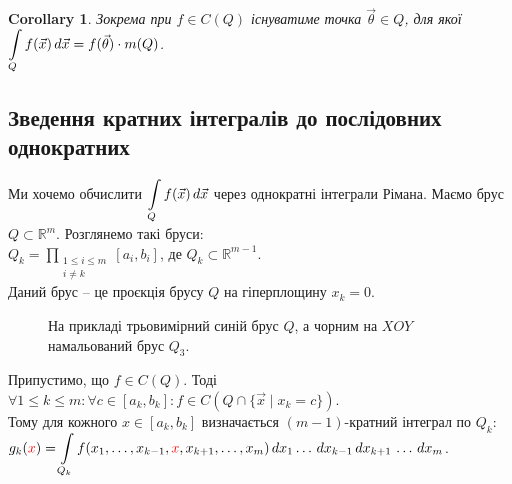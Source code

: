 \documentclass[a4paper, 10pt]{article}
\theoremstyle{theoremdd}
\theoremstyle{theoremdd}
\theoremstyle{theoremdd}
\theoremstyle{theoremdd}
\theoremstyle{theoremdd}
\theoremstyle{theoremdd}
\theoremstyle{theoremdd}
\theoremstyle{theoremdd}
\theoremstyle{theoremdd}
\theoremstyle{theoremdd}
\theoremstyle{theoremdd}
\theoremstyle{theoremdd}
\theoremstyle{theoremdd}
\theoremstyle{theoremdd}
\newtheorem{corollary}[theorem]{Corollary}
\theoremstyle{theoremdd}
\begin{document}
\begin{corollary}
Зокрема при $f \in C(Q)$ існуватиме точка $\vec{\theta} \in Q$, для якої $\displaystyle\int\displaylimits_Q f(\vec{x})\,d\vec{x} = f(\vec{\theta}) \cdot m (Q)$.
\end{corollary}

\subsection{Зведення кратних інтегралів до послідовних однократних}
Ми хочемо обчислити $\displaystyle\int\displaylimits_Q f(\vec{x})\,d\vec{x}$ через однократні інтеграли Рімана. Маємо брус $Q \subset \mathbb{R}^m$. Розглянемо такі бруси:\\
$Q_k = \displaystyle\prod_{\substack{1 \leq i \leq m \\ i \neq k}} [a_i,b_i]$, де $Q_k \subset \mathbb{R}^{m-1}$. \\
Даний брус -- це проєкція брусу $Q$ на гіперплощину $x_k = 0$.\\
\begin{figure}[H]
\centering
{}
\caption*{На прикладі трьовимірний синій брус $Q$, а чорним на $XOY$ намальований брус $Q_3$.}
\end{figure}
Припустимо, що $f \in C(Q)$. Тоді $\forall 1 \leq k \leq m: \forall c \in [a_k,b_k]: f \in C(Q \cap \{ \vec{x} \mid x_k = c \})$.\\
Тому для кожного $x \in [a_k,b_k]$ визначається $(m-1)$-кратний інтеграл по $Q_k$:\\
$g_k(\textcolor{red}{x}) = \displaystyle\int\displaylimits_{Q_k}f(x_1,\dots,x_{k-1},\textcolor{red}{x},x_{k+1},\dots,x_m)\,dx_1\dots \,dx_{k-1}\,dx_{k+1}\,\dots\,dx_m$.
\end{document}
